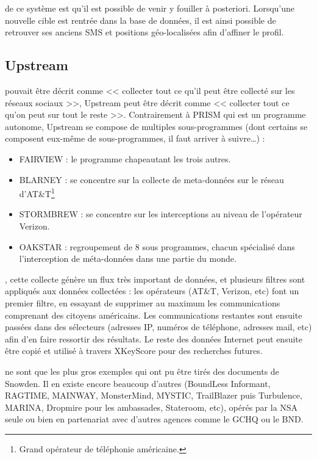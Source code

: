  de ce système est qu'il est possible de venir y
fouiller à posteriori. Lorsqu'une nouvelle cible est rentrée dans la base de
données, il est ainsi possible de retrouver ses anciens SMS et positions
géo-localisées afin d'affiner le profil.

\subsection{Upstream}

 pouvait être décrit comme << collecter tout ce qu'il
peut être collecté sur les réseaux sociaux >>, Upstream peut être décrit comme
<< collecter tout ce qu'on peut sur tout le reste >>. Contrairement à PRISM qui
est un programme autonome, Upstream se compose de multiples sous-programmes
(dont certains se composent eux-même de sous-programmes, il faut arriver à
suivre\ldots) :

\begin{itemize}
  \item FAIRVIEW : le programme chapeautant les trois autres.
  \item BLARNEY : se concentre sur la collecte de meta-données sur le réseau
  d'AT\&T\footnote{Grand opérateur de téléphonie américaine.}
  \item STORMBREW : se concentre sur les interceptions au niveau de l'opérateur
  Verizon.
  \item OAKSTAR : regroupement de 8 sous programmes, chacun spécialisé dans
  l'interception de méta-données dans une partie du monde.
\end{itemize}

, cette collecte génère un flux très important
de données, et plusieurs filtres sont appliqués aux données collectées : les
opérateurs (AT\&T, Verizon, etc) font un premier filtre, en essayant de
supprimer au maximum les communications comprenant des citoyens américains.
Les communications restantes sont ensuite passées dans des sélecteurs (adresses
IP, numéros de téléphone, adresses mail, etc) afin d'en faire ressortir des
résultats. Le reste des données Internet peut ensuite être copié et utilisé à
travers XKeyScore pour des recherches futures.


 ne sont que les plus gros exemples qui ont pu
être tirés des documents de Snowden. Il en existe encore beaucoup d'autres
(BoundLess Informant, RAGTIME, MAINWAY, MonsterMind, MYSTIC, TrailBlazer puis
Turbulence, MARINA, Dropmire pour les ambassades, Stateroom, etc), opérés par
la NSA seule ou bien en partenariat avec d'autres agences comme le GCHQ ou le
BND.

